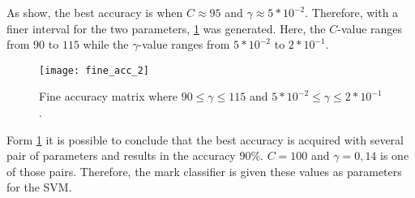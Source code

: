  As show, the best accuracy is when $C \approx 95$ and $\gamma \approx 5*10^{-2}$. Therefore, with a finer interval for the two parameters, \cref{fig:fine_acc} was generated. Here, the $C$-value ranges from $90$ to $115$ while the $\gamma$-value ranges from $5*10^{-2}$ to $2*10^{-1}$. 

\begin{figure}[h!]
	\centering
	\texttt{[image: fine\_acc\_2]}
	\caption{Fine accuracy matrix where $90 \leq \gamma \leq 115$ and $5*10^{-2} \leq \gamma \leq 2*10^{-1}$.
		 \label{fig:fine_acc}}
\end{figure}

Form \cref{fig:fine_acc} it is possible to conclude that the best accuracy is acquired with several pair of parameters and results in the accuracy 90\%. $C = 100$ and $\gamma = 0,14$ is one of those pairs. Therefore, the mark classifier is given these values as parameters for the SVM. 


